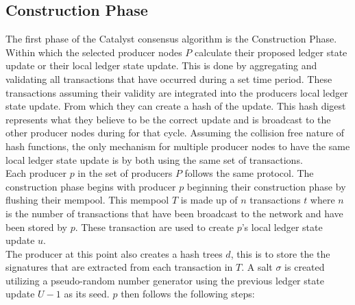 \documentclass{article}
\begin{document}
\subsection{Construction Phase}

The first phase of the Catalyst consensus algorithm is the Construction Phase. Within which the selected producer nodes  $P$ calculate their proposed ledger state update or their local ledger state update. This is done by aggregating and validating all transactions that have occurred during a set time period. These transactions assuming their validity are integrated into the producers local ledger state update. From which they can create a hash of the update. This hash digest represents what they believe to be the correct update and is broadcast to the other producer nodes during for that cycle. Assuming the collision free nature of hash functions, the only mechanism for multiple producer nodes to have the same local ledger state update is by both using the same set of transactions. \\



Each producer $p$ in the set of producers $P$ follows the same protocol. The construction phase begins with producer $p$ beginning their construction phase by flushing their mempool. This mempool $T$ is made up of $n$ transactions $t$  where $n$ is the number of transactions that have been broadcast to the network and have been stored by $p$. These transaction are used to create $p$'s local ledger state update $u$.  \\

The producer at this point also creates a hash trees $d$, this is to store the the signatures that are extracted from each transaction in $T$. A salt $\sigma$ is created utilizing a pseudo-random number generator using the previous ledger state update $U-1$ as its seed. $p$ then follows the following steps: 
\end{document}
